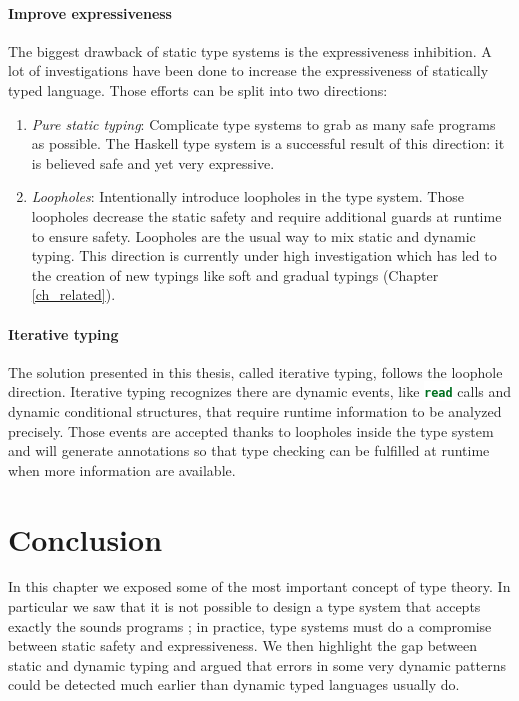 \documentclass[a4paper]{report}
\newcommand{\ischeme}[1]{\colorbox{white}{\lstinline[language=scheme]&#1&}} %
\newcommand{\refch}[1]{(Chapter \ref{#1})}
\begin{document}
\paragraph{Improve expressiveness} The biggest drawback of static type systems is the expressiveness inhibition. A lot of investigations have been done to increase the expressiveness of statically typed language. Those efforts can be split into two directions:
\begin{enumerate}
\item \emph{Pure static typing}: Complicate type systems to grab as many safe programs as possible. The Haskell type system is a successful result of this direction: it is believed safe and yet very expressive. 
\item \emph{Loopholes}: Intentionally introduce loopholes in the type system. Those loopholes decrease the static safety and require additional guards at runtime to ensure safety. Loopholes are the usual way to mix static and dynamic typing. This direction is currently under high investigation which has led to the creation of new typings like soft and gradual typings \refch{ch_related}.
\end{enumerate}

\paragraph{Iterative typing} The solution presented in this thesis, called iterative typing, follows the loophole direction. Iterative typing recognizes there are dynamic events, like \ischeme{read} calls and dynamic conditional structures, that require runtime information to be analyzed precisely. Those events are accepted thanks to loopholes inside the type system and will generate annotations so that type checking can be fulfilled at runtime when more information are available.

\section{Conclusion}

In this chapter we exposed some of the most important concept of type theory. In particular we saw that it is not possible to design a type system that accepts exactly the sounds programs ; in practice, type systems must do a compromise between static safety and expressiveness. We then highlight the gap between static and dynamic typing and argued that errors in some very dynamic patterns could be detected much earlier than dynamic typed languages usually do.
\end{document}

